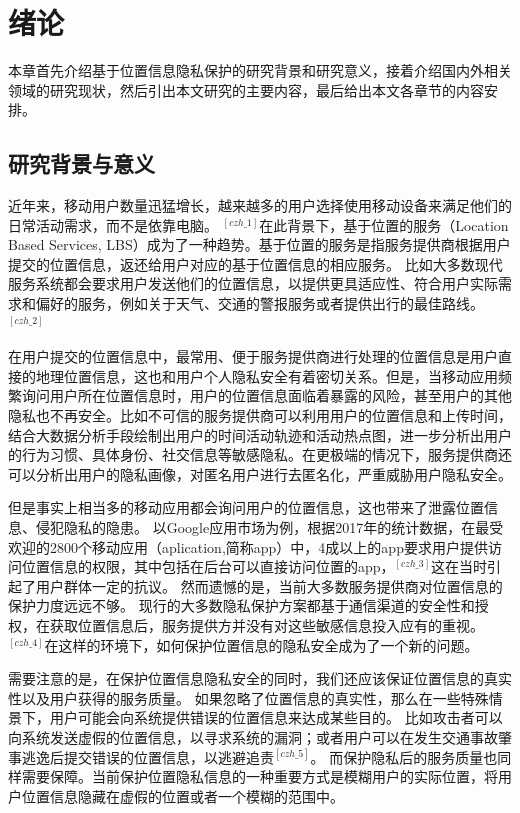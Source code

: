 \documentclass[zihao=-4]{ctexart}
\begin{document}
\section{绪论}
本章首先介绍基于位置信息隐私保护的研究背景和研究意义，接着介绍国内外相关领域的研究现状，然后引出本文研究的主要内容，最后给出本文各章节的内容安排。

\subsection{研究背景与意义}
近年来，移动用户数量迅猛增长，越来越多的用户选择使用移动设备来满足他们的日常活动需求，而不是依靠电脑。
$^{[czh\_1]}$在此背景下，基于位置的服务（Location Based Services, LBS）成为了一种趋势。基于位置的服务是指服务提供商根据用户提交的位置信息，返还给用户对应的基于位置信息的相应服务。
比如大多数现代服务系统都会要求用户发送他们的位置信息，以提供更具适应性、符合用户实际需求和偏好的服务，例如关于天气、交通的警报服务或者提供出行的最佳路线。$^{[czh\_2]}$
\par
在用户提交的位置信息中，最常用、便于服务提供商进行处理的位置信息是用户直接的地理位置信息，这也和用户个人隐私安全有着密切关系。但是，当移动应用频繁询问用户所在位置信息时，用户的位置信息面临着暴露的风险，甚至用户的其他隐私也不再安全。比如不可信的服务提供商可以利用用户的位置信息和上传时间，结合大数据分析手段绘制出用户的时间活动轨迹和活动热点图，进一步分析出用户的行为习惯、具体身份、社交信息等敏感隐私。在更极端的情况下，服务提供商还可以分析出用户的隐私画像，对匿名用户进行去匿名化，严重威胁用户隐私安全。
\par
但是事实上相当多的移动应用都会询问用户的位置信息，这也带来了泄露位置信息、侵犯隐私的隐患。
以Google应用市场为例，根据2017年的统计数据，在最受欢迎的2800个移动应用（aplication,简称app）中，4成以上的app要求用户提供访问位置信息的权限，其中包括在后台可以直接访问位置的app，$^{[czh\_3]}$这在当时引起了用户群体一定的抗议。
然而遗憾的是，当前大多数服务提供商对位置信息的保护力度远远不够。
现行的大多数隐私保护方案都基于通信渠道的安全性和授权，在获取位置信息后，服务提供方并没有对这些敏感信息投入应有的重视。
$^{[czh\_4]}$在这样的环境下，如何保护位置信息的隐私安全成为了一个新的问题。
\par
需要注意的是，在保护位置信息隐私安全的同时，我们还应该保证位置信息的真实性以及用户获得的服务质量。
如果忽略了位置信息的真实性，那么在一些特殊情景下，用户可能会向系统提供错误的位置信息来达成某些目的。
比如攻击者可以向系统发送虚假的位置信息，以寻求系统的漏洞；或者用户可以在发生交通事故肇事逃逸后提交错误的位置信息，以逃避追责$^{[czh\_5]}$。
而保护隐私后的服务质量也同样需要保障。当前保护位置隐私信息的一种重要方式是模糊用户的实际位置，将用户位置信息隐藏在虚假的位置或者一个模糊的范围中。
\end{document}
